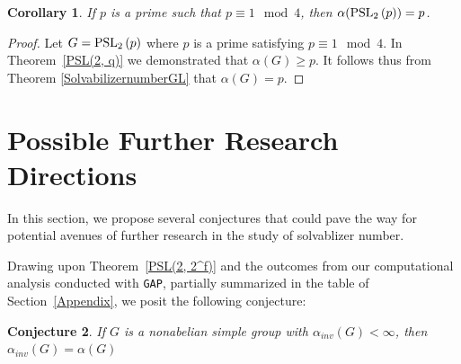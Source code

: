 \documentclass{amsart}
\newcommand{\gap}{\texttt{GAP}}
\newcommand{\Solv}{\text{Sol}}
\newtheorem{theorem}{Theorem}[section]
\newtheorem{corollary}[theorem]{Corollary}
\newtheorem{conjecture}[theorem]{Conjecture}
\theoremstyle{definition}
\theoremstyle{remark}
\begin{document}

\begin{corollary}\label{PSL(2,4t+1)}
If $p$ is a prime such that $p \equiv 1 \mod 4$, then $\alpha(\operatorname{PSL}_{2}\left(p\right))=p$.
    
\end{corollary}
\begin{proof}
Let $G=\operatorname{PSL}_{2}\left(p\right)$ where $p$ is a prime satisfying $p \equiv 1 \mod 4$. In Theorem~\ref{PSL(2, q)} we demonstrated that $\alpha(G)\geq p$. It follows thus from Theorem \ref{SolvabilizernumberGL} that $\alpha(G)=p$.

\end{proof}


\section{Possible Further Research Directions}

In this section, we propose several conjectures that could pave the way for potential avenues of further research in the study of solvablizer number.


Drawing upon Theorem~\ref{PSL(2, 2^f)} and the outcomes from our computational analysis conducted with \gap, partially summarized in the table of Section~\ref{Appendix}, we posit the following conjecture:

\begin{conjecture}
If $G$ is a nonabelian simple group with $\alpha_{inv}(G)<\infty$, then $\alpha_{inv}(G)=\alpha(G)$
\end{conjecture}
\end{document}
